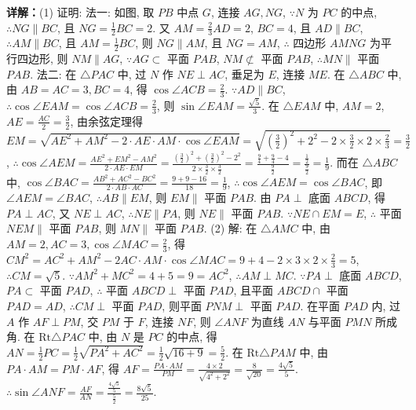 \begin{question}[points=12]
\begin{solution}
\textbf{详解：}(1) 证明: 法一: 如图, 取 $PB$ 中点 $G$, 连接 $AG,NG$, $\because N$ 为 $PC$ 的中点, $\therefore NG\parallel BC$, 且 $NG=\frac{1}{2}BC=2$. 又 $AM=\frac{2}{3}AD=2$, $BC=4$, 且 $AD\parallel BC$, $\therefore AM\parallel BC$, 且 $AM=\frac{1}{2}BC$, 则 $NG\parallel AM$, 且 $NG=AM$, $\therefore$ 四边形 $AMNG$ 为平行四边形, 则 $NM\parallel AG$, $\because AG\subset$ 平面 $PAB$, $NM\not\subset$ 平面 $PAB$, $\therefore MN\parallel$ 平面 $PAB$.
法二: 在 $\triangle PAC$ 中, 过 $N$ 作 $NE\perp AC$, 垂足为 $E$, 连接 $ME$. 在 $\triangle ABC$ 中, 由 $AB=AC=3,BC=4$, 得 $\cos\angle ACB=\frac{2}{3}$. $\because AD\parallel BC$, $\therefore\cos\angle EAM=\cos\angle ACB=\frac{2}{3}$, 则 $\sin\angle EAM=\frac{\sqrt{5}}{3}$. 在 $\triangle EAM$ 中, $AM=2$, $AE=\frac{AC}{2}=\frac{3}{2}$, 由余弦定理得 $EM=\sqrt{AE^2+AM^2-2\cdot AE\cdot AM\cdot\cos\angle EAM}=\sqrt{(\frac{3}{2})^2+2^2-2\times\frac{3}{2}\times2\times\frac{2}{3}}=\frac{3}{2}$, $\therefore\cos\angle AEM=\frac{AE^2+EM^2-AM^2}{2\cdot AE\cdot EM}=\frac{(\frac{3}{2})^2+(\frac{3}{2})^2-2^2}{2\times\frac{3}{2}\times\frac{3}{2}}=\frac{\frac{9}{4}+\frac{9}{4}-4}{\frac{9}{2}}=\frac{\frac{1}{2}}{\frac{9}{2}}=\frac{1}{9}$. 而在 $\triangle ABC$ 中, $\cos\angle BAC=\frac{AB^2+AC^2-BC^2}{2\cdot AB\cdot AC}=\frac{9+9-16}{18}=\frac{1}{9}$, $\therefore\cos\angle AEM=\cos\angle BAC$, 即 $\angle AEM=\angle BAC$, $\therefore AB\parallel EM$, 则 $EM\parallel$ 平面 $PAB$. 由 $PA\perp$ 底面 $ABCD$, 得 $PA\perp AC$, 又 $NE\perp AC$, $\therefore NE\parallel PA$, 则 $NE\parallel$ 平面 $PAB$. $\because NE\cap EM=E$, $\therefore$ 平面 $NEM\parallel$ 平面 $PAB$, 则 $MN\parallel$ 平面 $PAB$.
(2) 解: 在 $\triangle AMC$ 中, 由 $AM=2,AC=3,\cos\angle MAC=\frac{2}{3}$, 得 $CM^2=AC^2+AM^2-2AC\cdot AM\cdot\cos\angle MAC=9+4-2\times3\times2\times\frac{2}{3}=5$, $\therefore CM=\sqrt{5}$. $\because AM^2+MC^2=4+5=9=AC^2$, $\therefore AM\perp MC$. $\because PA\perp$ 底面 $ABCD$, $PA\subset$ 平面 $PAD$, $\therefore$ 平面 $ABCD\perp$ 平面 $PAD$, 且平面 $ABCD\cap$ 平面 $PAD=AD$, $\therefore CM\perp$ 平面 $PAD$, 则平面 $PNM\perp$ 平面 $PAD$. 在平面 $PAD$ 内, 过 $A$ 作 $AF\perp PM$, 交 $PM$ 于 $F$, 连接 $NF$, 则 $\angle ANF$ 为直线 $AN$ 与平面 $PMN$ 所成角. 在 $\mathrm{Rt}\triangle PAC$ 中, 由 $N$ 是 $PC$ 的中点, 得 $AN=\frac{1}{2}PC=\frac{1}{2}\sqrt{PA^2+AC^2}=\frac{1}{2}\sqrt{16+9}=\frac{5}{2}$. 在 $\mathrm{Rt}\triangle PAM$ 中, 由 $PA\cdot AM=PM\cdot AF$, 得 $AF=\frac{PA\cdot AM}{PM}=\frac{4\times2}{\sqrt{4^2+2^2}}=\frac{8}{\sqrt{20}}=\frac{4\sqrt{5}}{5}$. $\therefore \sin\angle ANF=\frac{AF}{AN}=\frac{\frac{4\sqrt{5}}{5}}{\frac{5}{2}}=\frac{8\sqrt{5}}{25}$.
\end{solution}
\end{question}

